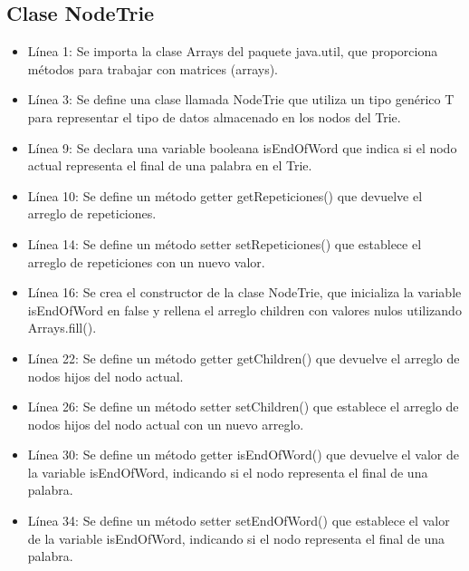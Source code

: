 \documentclass{article}
\begin{document}
	\subsection{Clase NodeTrie}
	\begin{itemize}
		\item Línea 1: Se importa la clase Arrays del paquete java.util, que proporciona métodos para trabajar con matrices (arrays).

	\item Línea 3: Se define una clase llamada NodeTrie que utiliza un tipo genérico T para representar el tipo de datos almacenado en los nodos del Trie.

	\item Línea 9: Se declara una variable booleana isEndOfWord que indica si el nodo actual representa el final de una palabra en el Trie.

	\item Línea 10: Se define un método getter getRepeticiones() que devuelve el arreglo de repeticiones.

	\item Línea 14: Se define un método setter setRepeticiones() que establece el arreglo de repeticiones con un nuevo valor.

	\item Línea 16: Se crea el constructor de la clase NodeTrie, que inicializa la variable isEndOfWord en false y rellena el arreglo children con valores nulos utilizando Arrays.fill().

	\item Línea 22: Se define un método getter getChildren() que devuelve el arreglo de nodos hijos del nodo actual.

	\item Línea 26: Se define un método setter setChildren() que establece el arreglo de nodos hijos del nodo actual con un nuevo arreglo.

	\item Línea 30: Se define un método getter isEndOfWord() que devuelve el valor de la variable isEndOfWord, indicando si el nodo representa el final de una palabra.

	\item Línea 34: Se define un método setter setEndOfWord() que establece el valor de la variable isEndOfWord, indicando si el nodo representa el final de una palabra.
	\end{itemize}

		
\end{document}
